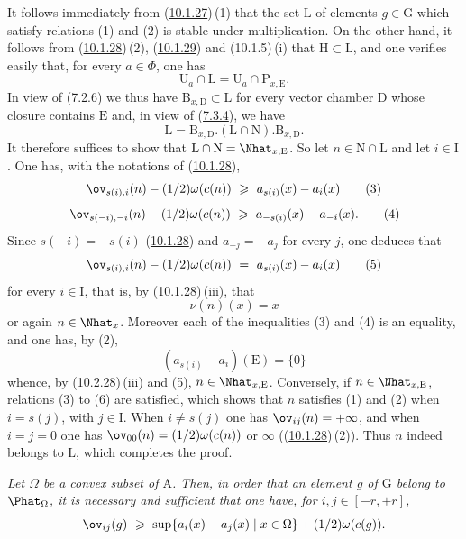 \documentclass[12pt,a4paper,oneside,english]{smfart}
\makeatletter
\newcommand{\btanchor}[1]{\leavevmode\Hy@raisedlink{\hypertarget{bt:#1}{}}}
\newcommand{\btref}[1]{\hyperlink{bt:#1}{#1}}
\theoremstyle{definition}
\theoremstyle{bt}
\makeatother
\begin{document}
\pf
It follows immediately from (\btref{10.1.27})\,(1) that the set $\mathrm{L}$ of elements
$g\in\mathrm{G}$ which satisfy relations (1) and (2) is stable under
multiplication. On the other hand, it follows from (\btref{10.1.28})\,(2), (\btref{10.1.29}) and
(10.1.5)\,(i) that $\mathrm{H}\subset \mathrm{L}$, and one verifies easily that,
for every $a\in\Phi$, one has
\[
\mathrm{U}_a\cap \mathrm{L}=\mathrm{U}_a\cap \mathrm{P}_{x,\mathrm{E}}.
\]
In view of (7.2.6) we thus have $\mathrm{B}_{x,\mathrm{D}}\subset \mathrm{L}$
for every vector chamber $\mathrm{D}$ whose closure contains $\mathrm{E}$
and, in view of (\btref{7.3.4}), we have
\[
\mathrm{L}=\mathrm{B}_{x,\mathrm{D}}.(\mathrm{L}\cap \mathrm{N}).\mathrm{B}_{x,\mathrm{D}}.
\]
It therefore suffices to show that $\mathrm{L}\cap
\mathrm{N}=\Nhat_{x,\mathrm{E}}$. So let $n\in \mathrm{N}\cap \mathrm{L}$ and
let $i\in\mathrm{I}$. One has, with the notations of (\btref{10.1.28}),
\begin{equation*}
\ov_{s(i),i}(n)-(1/2)\omega(c(n))\ \geqslant\ a_{s(i)}(x)-a_i(x)
\tag{3}
\end{equation*}
\begin{equation*}
\ov_{s(-i),-i}(n)-(1/2)\omega(c(n))\ \geqslant\ a_{-s(i)}(x)-a_{-i}(x).
\tag{4}
\end{equation*}
Since $s(-i)=-s(i)$ (\btref{10.1.28}) and $a_{-j}=-a_j$ for every $j$, one deduces that
\begin{equation*}
\ov_{s(i),i}(n)-(1/2)\omega(c(n))\ =\ a_{s(i)}(x)-a_i(x)
\tag{5}
\end{equation*}
for every $i\in\mathrm{I}$, that is, by (\btref{10.1.28})\,(iii), that
\[
\nu(n)(x)=x
\]
or again $n\in\Nhat_{x}$. Moreover each of the inequalities (3) and (4) is an
equality, and one has, by (2),
\begin{equation*}
(a_{s(i)}-a_i)(\mathrm{E})=\{0\}
\tag{6}
\end{equation*}
whence, by (10.2.28)\,(iii) and (5), $n\in\Nhat_{x,\mathrm{E}}$.
Conversely, if $n\in\Nhat_{x,\mathrm{E}}$, relations (3) to (6) are satisfied,
which shows that $n$ satisfies (1) and (2) when $i=s(j)$, with $j\in\mathrm{I}$.
When $i\neq s(j)$ one has $\ov_{ij}(n)=+\infty$, and when $i=j=0$ one has
$\ov_{00}(n)=(1/2)\omega(c(n))$ or $\infty$ ((\btref{10.1.28})\,(2)). Thus $n$ indeed
belongs to $\mathrm{L}$, which completes the proof.

\btanchor{10.1.33}
\emph{Let $\Omega$ be a convex subset of $\mathrm{A}$. Then, in order that an
element $g$ of $\mathrm{G}$ belong to $\Phat_{\Omega}$, it is necessary and
sufficient that one have, for $i,j\in[-r,+r]$,}
\[
\ov_{ij}(g)\ \geqslant\ \sup\{a_i(x)-a_j(x)\mid x\in\Omega\}+(1/2)\omega(c(g)).
\]
\end{document}
